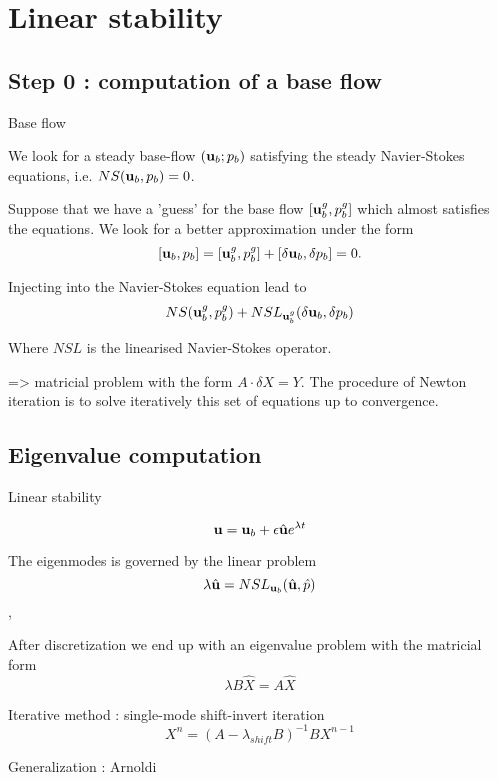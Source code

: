 \documentclass{beamer}
\newcommand{\be}[1]{ \begin{equation} \label{#1}}
\newcommand{\ee}{\end{equation}}
\newcommand{\ssp}{\vspace{.2cm} }
\begin{document}
\section{Linear stability }

\subsection{Step 0 : computation of a base flow}

\begin{frame}{Base flow}

We look for a steady base-flow $({\bf u}_b;p_b)$ satisfying the steady Navier-Stokes equations, i.e. 
$NS ({\bf u}_b,p_b) = 0$.


Suppose that we have a 'guess' for the base flow $[{\bf u}_b^g,p_b^g]$  which almost satisfies the equations.  We look for a better approximation under the form
\be{Newton1}
[{\bf u}_b,p_b]  = [{\bf u}_b^g,p_b^g] + [\delta {\bf u}_b, \delta p_b] = 0.
\ee

Injecting into the Navier-Stokes equation lead to $$
NS ({\bf u}_b^g,p_b^g) + NSL_{{\bf u}_b^g}(\delta {\bf u}_b,\delta p_b)$$


Where $NSL$ is the linearised Navier-Stokes operator. 



=>  matricial problem with the form $A \cdot \delta X = Y$. The procedure of Newton iteration is to solve iteratively this set of equations up to convergence.

\end{frame}




\subsection{Eigenvalue computation}

\begin{frame}{Linear stability}

\be{startmodepropre}
{\bf u} = {\bf u}_b + \epsilon \hat{\bf u} e^{\lambda t} 
\ee

The eigenmodes is governed by the linear problem 
$$\lambda \hat{{\bf u}} = NSL_{{\bf u}_b}( \hat{\bf u},\hat{p})$$,

After discretization we end up with an eigenvalue problem with the matricial form
\be{Eigen_matricial}
\lambda B \hat{X} = A \hat{X}
\ee

\ssp
Iterative method : single-mode shift-invert iteration
$$
X^{n} =  (A- \lambda_{shift} B)^{-1} B X^{n-1}
$$ 

Generalization : Arnoldi

\end{frame}
\end{document}
